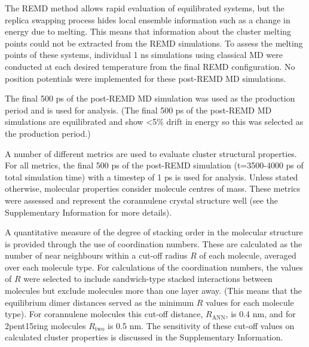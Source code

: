 The REMD method allows rapid evaluation of equilibrated systems, but the replica swapping process hides local ensemble information such as a change in energy due to melting. This means that information about the cluster melting points could not be extracted from the REMD simulations. To assess the melting points of these systems, individual 1 ns simulations using classical MD were conducted at each desired temperature from the final REMD configuration. No position potentials were implemented for these post-REMD MD simulations.

The final 500 ps of the post-REMD MD simulation was used as the production period and is used for analysis.
(The final 500 ps of the post-REMD MD simulations are equilibrated and show <5\% drift in energy so this was selected as the production period.)

A number of different metrics are used to evaluate cluster structural properties. For all metrics, the final 500 ps of the post-REMD simulation (t=3500-4000 ps of total simulation time) with a timestep of 1 ps is used for analysis. Unless stated otherwise, molecular properties consider molecule centres of mass.
These metrics were assessed and represent the corannulene crystal structure well (see the Supplementary Information for more details).


A quantitative measure of the degree of stacking order in the molecular structure is provided through the use of coordination numbers. These are calculated as the number of near neighbours within a cut-off radius $R$ of each molecule, averaged over each molecule type. 
For calculations of the coordination numbers, the values of $R$ were selected to include sandwich-type stacked interactions between molecules but exclude molecules more than one layer away. (This means that the equilibrium dimer distances served as the minimum $R$ values for each molecule type). For corannulene molecules this cut-off distance, $R_{\text{ANN}}$, is 0.4 nm, and for 2pent15ring molecules $R_{\text{two}}$ is 0.5 nm.  
The sensitivity of these cut-off values on calculated cluster properties is discussed in the Supplementary Information.

